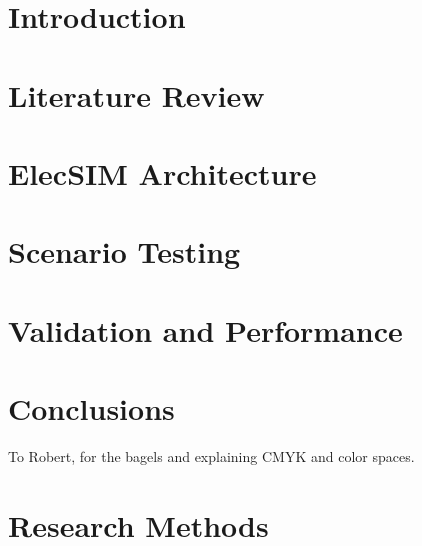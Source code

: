 \documentclass[sigconf]{acmart}
\begin{document}
%

%
\maketitle


\section{Introduction}


\section{Literature Review}\label{Literature Review}

\section{ElecSIM Architecture} \label{Model}



\section{Scenario Testing}\label{Scenario Testing}



\section{Validation and Performance}\label{Valdiation and Performance}


\section{Conclusions}\label{Conclusion}





%
\begin{acks}
To Robert, for the bagels and explaining CMYK and color spaces.
\end{acks}

%



% 
\appendix

\section{Research Methods}

\end{document}
